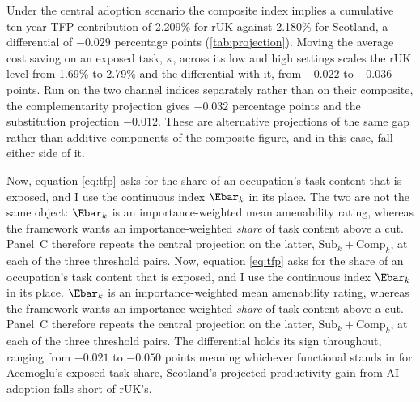 Under the central adoption scenario the composite index implies a cumulative ten-year TFP contribution of 2.209\% for rUK against 2.180\% for Scotland, a differential of $-0.029$ percentage points (\cref{tab:projection}). Moving the average cost saving on an exposed task, $\kappa$, across its low and high settings scales the rUK level from 1.69\% to 2.79\% and the differential with it, from $-0.022$ to $-0.036$ points. Run on the two channel indices separately rather than on their composite, the complementarity projection gives $-0.032$ percentage points and the substitution projection $-0.012$. These are alternative projections of the same gap rather than additive components of the composite figure, and in this case, fall either side of it.

Now, equation \eqref{eq:tfp} asks for the share of an occupation's task content that is exposed, and I use the continuous index $\Ebar_k$ in its place. The two are not the same object: $\Ebar_k$ is an importance-weighted mean amenability rating, whereas the framework wants an importance-weighted \emph{share} of task content above a cut. Panel~C therefore repeats the central projection on the latter, $\mathrm{Sub}_k + \mathrm{Comp}_k$, at each of the three threshold pairs. 
Now, equation \eqref{eq:tfp} asks for the share of an occupation's task content that is exposed, and I use the continuous index $\Ebar_k$ in its place. $\Ebar_k$ is an importance-weighted mean amenability rating, whereas the framework wants an importance-weighted \emph{share} of task content above a cut. Panel~C therefore repeats the central projection on the latter, $\mathrm{Sub}_k + \mathrm{Comp}_k$, at each of the three threshold pairs. The differential holds its sign throughout, ranging from $-0.021$ to $-0.050$ points meaning whichever functional stands in for Acemoglu's exposed task share, Scotland's projected productivity gain from AI adoption falls short of rUK's.


